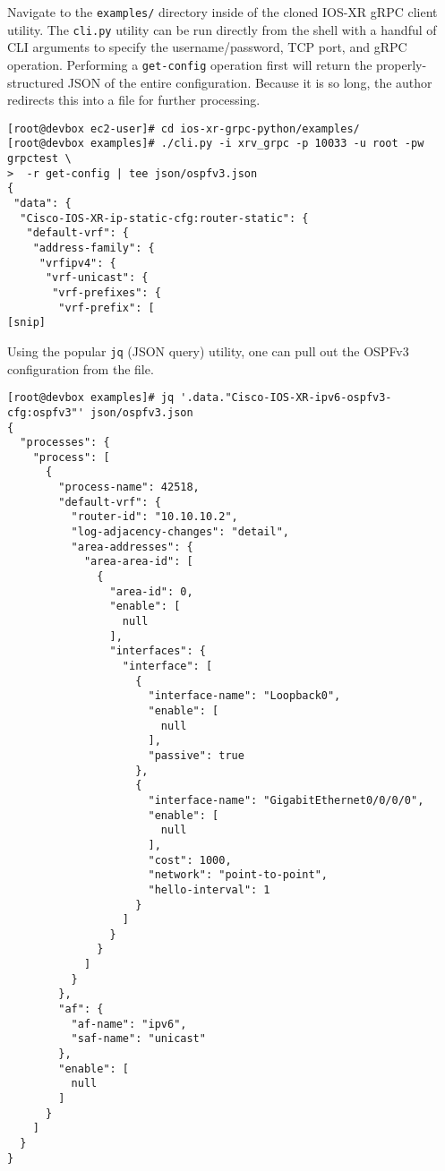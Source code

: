 Navigate to the \verb|examples/| directory inside of the cloned IOS-XR gRPC client
utility. The \verb|cli.py| utility can be run directly from the shell with a
handful of CLI arguments to specify the username/password, TCP port, and gRPC
operation. Performing a \verb|get-config| operation first will return the
properly-structured JSON of the entire configuration. Because it is so long,
the author redirects this into a file for further processing.

\begin{verbatim}
[root@devbox ec2-user]# cd ios-xr-grpc-python/examples/
[root@devbox examples]# ./cli.py -i xrv_grpc -p 10033 -u root -pw grpctest \
>  -r get-config | tee json/ospfv3.json
{
 "data": {
  "Cisco-IOS-XR-ip-static-cfg:router-static": {
   "default-vrf": {
    "address-family": {
     "vrfipv4": {
      "vrf-unicast": {
       "vrf-prefixes": {
        "vrf-prefix": [
[snip]
\end{verbatim}

Using the popular \verb|jq| (JSON query) utility, one can pull out the OSPFv3
configuration from the file.

\begin{verbatim}
[root@devbox examples]# jq '.data."Cisco-IOS-XR-ipv6-ospfv3-cfg:ospfv3"' json/ospfv3.json 
{
  "processes": {
    "process": [
      {
        "process-name": 42518,
        "default-vrf": {
          "router-id": "10.10.10.2",
          "log-adjacency-changes": "detail",
          "area-addresses": {
            "area-area-id": [
              {
                "area-id": 0,
                "enable": [
                  null
                ],
                "interfaces": {
                  "interface": [
                    {
                      "interface-name": "Loopback0",
                      "enable": [
                        null
                      ],
                      "passive": true
                    },
                    {
                      "interface-name": "GigabitEthernet0/0/0/0",
                      "enable": [
                        null
                      ],
                      "cost": 1000,
                      "network": "point-to-point",
                      "hello-interval": 1
                    }
                  ]
                }
              }
            ]
          }
        },
        "af": {
          "af-name": "ipv6",
          "saf-name": "unicast"
        },
        "enable": [
          null
        ]
      }
    ]
  }
}
\end{verbatim}

